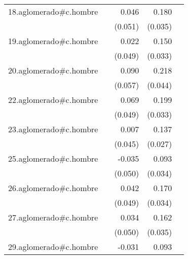 {\begin{longtable}{l*{4}{D{.}{.}{-1}}}
\addlinespace
18.aglomerado#c.hombre&                     &       0.046         &       0.180\sym{***}&                     \\
            &                     &     (0.051)         &     (0.035)         &                     \\
\addlinespace
19.aglomerado#c.hombre&                     &       0.022         &       0.150\sym{***}&                     \\
            &                     &     (0.049)         &     (0.033)         &                     \\
\addlinespace
20.aglomerado#c.hombre&                     &       0.090         &       0.218\sym{***}&                     \\
            &                     &     (0.057)         &     (0.044)         &                     \\
\addlinespace
22.aglomerado#c.hombre&                     &       0.069         &       0.199\sym{***}&                     \\
            &                     &     (0.049)         &     (0.033)         &                     \\
\addlinespace
23.aglomerado#c.hombre&                     &       0.007         &       0.137\sym{***}&                     \\
            &                     &     (0.045)         &     (0.027)         &                     \\
\addlinespace
25.aglomerado#c.hombre&                     &      -0.035         &       0.093\sym{**} &                     \\
            &                     &     (0.050)         &     (0.034)         &                     \\
\addlinespace
26.aglomerado#c.hombre&                     &       0.042         &       0.170\sym{***}&                     \\
            &                     &     (0.049)         &     (0.034)         &                     \\
\addlinespace
27.aglomerado#c.hombre&                     &       0.034         &       0.162\sym{***}&                     \\
            &                     &     (0.050)         &     (0.035)         &                     \\
\addlinespace
29.aglomerado#c.hombre&                     &      -0.031         &       0.093\sym{**} &                     \\

\end{longtable}}
